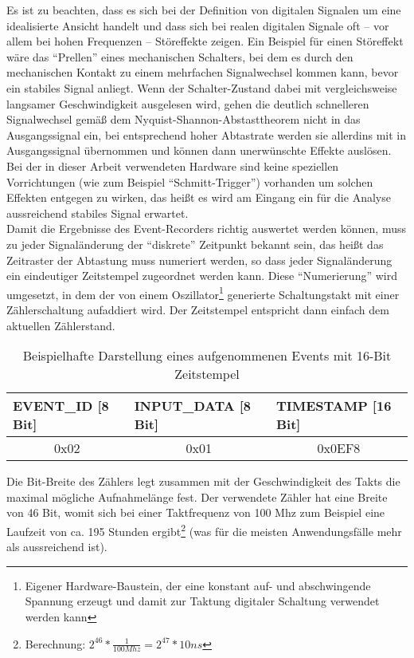 Es ist zu beachten, dass es sich bei der Definition von digitalen Signalen um eine idealisierte Ansicht handelt und dass sich bei realen digitalen Signale oft -- vor allem bei hohen Frequenzen -- Störeffekte zeigen. Ein Beispiel für einen Störeffekt wäre das ``Prellen'' eines mechanischen Schalters, bei dem es durch den mechanischen Kontakt zu einem mehrfachen Signalwechsel kommen kann, bevor ein stabiles Signal anliegt. Wenn der Schalter-Zustand dabei mit vergleichsweise langsamer Geschwindigkeit ausgelesen wird, gehen die deutlich schnelleren Signalwechsel gemäß dem Nyquist-Shannon-Abstasttheorem nicht in das Ausgangssignal ein, bei entsprechend hoher Abtastrate werden sie allerdins mit in Ausgangssignal übernommen und können dann unerwünschte Effekte auslösen.\\
Bei der in dieser Arbeit verwendeten Hardware sind keine speziellen Vorrichtungen (wie zum Beispiel ``Schmitt-Trigger'') vorhanden um solchen Effekten entgegen zu wirken, das heißt es wird am Eingang ein für die Analyse aussreichend stabiles Signal erwartet.   \\

Damit die Ergebnisse des Event-Recorders richtig auswertet werden können, muss zu jeder Signaländerung der ``diskrete'' Zeitpunkt bekannt sein, das heißt das Zeitraster der Abtastung muss numeriert werden, so dass jeder Signaländerung ein eindeutiger Zeitstempel zugeordnet werden kann.
Diese ``Numerierung'' wird umgesetzt, in dem der von einem Oszillator\footnote{Eigener Hardware-Baustein, der eine konstant auf- und abschwingende Spannung erzeugt und damit zur Taktung digitaler Schaltung verwendet werden kann} generierte Schaltungstakt mit einer Zählerschaltung aufaddiert wird. Der Zeitstempel entspricht dann einfach dem aktuellen Zählerstand.\\


\begin{table}[h]
\centering
\begin{tabular}{|l|l|l|}
\hline
\rowcolor[HTML]{EFEFEF} 
	EVENT\_ID [8 Bit] & INPUT\_DATA [8 Bit] & TIMESTAMP [16 Bit]\\ \hline
	\multicolumn{1}{|c|}{0x02} & \multicolumn{1}{c|}{0x01} & \multicolumn{1}{c|}{0x0EF8} \\ \hline
\end{tabular}
\caption{Beispielhafte Darstellung eines aufgenommenen Events mit 16-Bit Zeitstempel}
\label{my-label}
\end{table}


Die Bit-Breite des Zählers legt zusammen mit der Geschwindigkeit des Takts die maximal mögliche Aufnahmelänge fest. Der verwendete Zähler hat eine Breite von 46 Bit, womit sich bei einer Taktfrequenz von 100 Mhz zum Beispiel eine Laufzeit von ca. 195 Stunden ergibt\footnote{Berechnung: \(2^{46} * \frac{1}{100 Mhz} = 2^{47} * 10 ns\) } (was für die meisten Anwendungsfälle mehr als aussreichend ist). 



